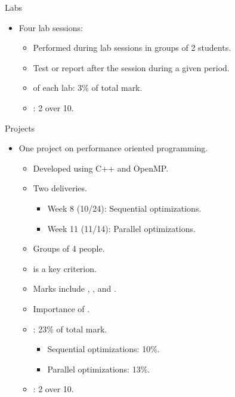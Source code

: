 \begin{frame}[t]{Labs}
\begin{itemize}
  \item Four lab sessions:
    \begin{itemize}
        \item Performed during lab sessions in groups of 2 students.
        \item Test or report after the session during a given period.
        \item {} of each lab: 3\% of total mark.
        \item {}: 2 over 10.
    \end{itemize}
\end{itemize}
\end{frame}

\begin{frame}[t]{Projects}
\begin{itemize}
  \item One project on performance oriented programming.
    \begin{itemize}
        \item Developed using C++ and OpenMP.
        \item Two deliveries.
        \begin{itemize}
          \item Week 8 (10/24): Sequential optimizations.
          \item Week 11 (11/14): Parallel optimizations.
        \end{itemize}

        \item Groups of 4 people.
        \item {} is a key criterion.
        \item Marks include , , 
              and .
        \item Importance of .
        \item {}: 23\% of total mark.
          \begin{itemize}
            \item Sequential optimizations: 10\%.
            \item Parallel optimizations: 13\%.
          \end{itemize}
        \item {}: 2 over 10.
    \end{itemize}
\end{itemize}
\end{frame}

